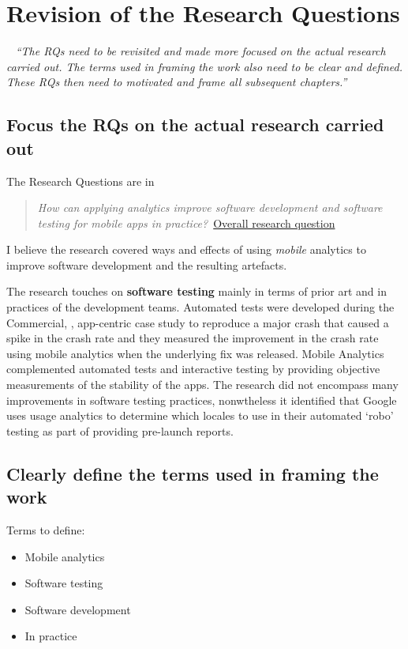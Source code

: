 \section{Revision of the Research Questions}~\label{corrections-rqs}
\emph{``The RQs need to be revisited and made more focused on the actual research carried out. The terms used in framing the work also need to be clear and defined. These RQs then need to motivated and frame all subsequent chapters.''}

\subsection{Focus the RQs on the actual research carried out}
The Research Questions are in 

\begin{quote}
  \emph{How can applying analytics improve software development and software testing for mobile apps in practice?}~\href{overall-research-question}{Overall research question}
\end{quote}

I believe the research covered ways and effects  of using \emph{mobile} analytics to improve software development and the resulting artefacts.

The research touches on \textbf{software testing} mainly in terms of prior art and in practices of the development teams. Automated tests were developed during the Commercial, , app-centric case study to reproduce a major crash that caused a spike in the crash rate and they measured the improvement in the crash rate using mobile analytics when the underlying fix was released. Mobile Analytics complemented automated tests and interactive testing by providing objective measurements of the stability of the apps. The research did not encompass many improvements in software testing practices, nonwtheless it identified that Google uses usage analytics to determine which locales to use in their automated `robo' testing as part of providing pre-launch reports.

\subsection{Clearly define the terms used in framing the work}
Terms to define:  
\begin{itemize}
    \item Mobile analytics
    \item Software testing
    \item Software development
    \item In practice
\end{itemize}
